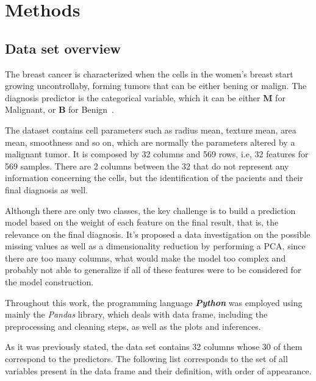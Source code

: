 \documentclass[conference]{IEEEtran}
\begin{document}
\section{Methods}
\subsection{Data set overview}

The breast cancer is characterized when the cells in the women's breast start growing uncontrollaby, forming tumors that can be either bening or malign. The diagnosis predictor is the categorical variable, which it can be either \textbf{M} for Malignant, or \textbf{B} for Benign~\cite{Street1993}.

The dataset contains cell parameters such as radius mean, texture mean, area mean, smoothness and so on, which are normally the parameters altered by a malignant tumor. It is composed by 32 columns and 569 rows, i.e, 32 features for 569 samples. There are 2 columns between the 32 that do not represent any information concerning the cells, but the identification of the pacients and their final diagnosis as well. 

Although there are only two classes, the key challenge is to build a prediction model based on the weight of each feature on the final result, that is, the relevance on the final diagnosis. It's proposed a data investigation on the possible missing values as well as a dimensionality reduction by performing a PCA, since there are too many columns, what would make the model too complex and probably not able 
to generalize if all of these features were to be considered for the model construction. 

Throughout this work, the programming language \textit{\textbf{Python}} was employed 
using mainly the \textit{Pandas} library, which deals with data frame, including the 
preprocessing and cleaning steps, as well as the plots and inferences. 

As it was previously stated, the data set contains 32 columns whose 30 of them 
correspond to the predictors. The following list corresponds to the set of all 
variables present in the data frame and their definition, with order of appearance. 
\end{document}
